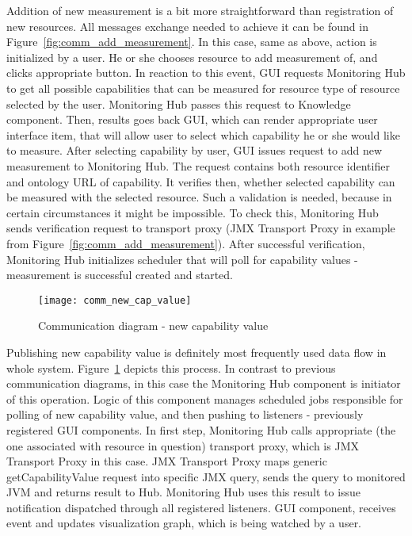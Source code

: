 Addition of new measurement is a bit more straightforward than registration of new resources. All messages exchange
needed to achieve it can be found in Figure~\ref{fig:comm_add_measurement}. In this case, same as above, action is
initialized by a user. He or she chooses resource to add measurement of, and clicks appropriate button. In reaction
to this event, GUI  requests Monitoring Hub to get all possible capabilities that can be measured for resource type of
resource selected by the user. Monitoring Hub passes this request to Knowledge component. Then, results goes back GUI,
which can render appropriate user interface item, that will allow user to select which capability he or she would like
to measure. After selecting capability by user, GUI issues request to add new measurement to Monitoring Hub. The request
contains both resource identifier and ontology URL of capability. It verifies then, whether selected capability can be
measured with the selected resource. Such a validation is needed, because in certain circumstances it might
be impossible. To check this, Monitoring Hub sends verification request to transport proxy (JMX Transport Proxy in
example from Figure~\ref{fig:comm_add_measurement}). After successful verification, Monitoring Hub initializes scheduler
that will poll for capability values - measurement is successful created and started.


\begin{figure}[h]
  \centering
  \texttt{[image: comm\_new\_cap\_value]}
  \caption{Communication diagram - new capability value}
  \label{fig:comm_new_cap_value}
\end{figure}

Publishing new capability value is definitely most frequently used data flow in whole
system. Figure~\ref{fig:comm_new_cap_value} depicts this process. In contrast to previous communication diagrams, in
this case the Monitoring Hub component is initiator of this operation. Logic of this component manages
scheduled jobs responsible for polling of new capability value, and then pushing to listeners - previously registered
GUI components. In first step, Monitoring Hub calls appropriate (the one associated with resource in question) transport
proxy, which is JMX Transport Proxy in this case. JMX Transport Proxy maps generic getCapabilityValue request into
specific JMX query, sends the query to monitored JVM and returns result to Hub. Monitoring Hub uses this result to issue
notification dispatched through all registered listeners. GUI component, receives event and updates visualization graph,
which is being watched by a user.


